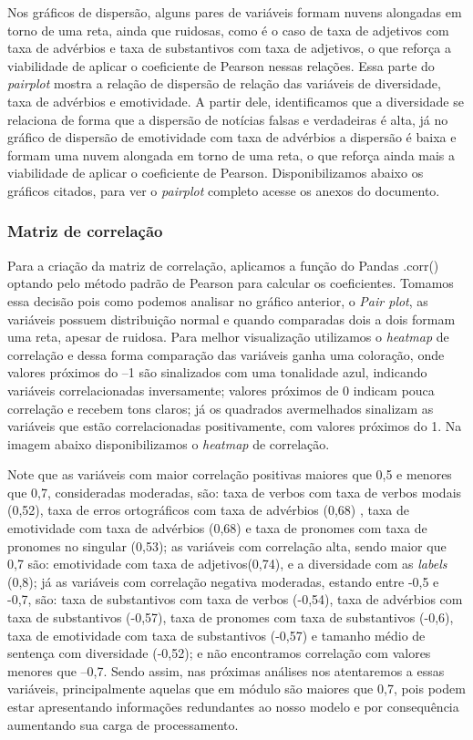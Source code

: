 \documentclass[
  brazilian,
  11pt,
]{article}
\begin{document}
Nos gráficos de dispersão, alguns pares de variáveis formam nuvens alongadas em torno de uma reta, ainda que ruidosas, como é o caso de taxa de adjetivos com taxa de advérbios e taxa de substantivos com taxa de adjetivos, o que reforça a viabilidade de aplicar o coeficiente de Pearson nessas relações. Essa parte do \emph{pairplot} mostra a relação de dispersão de relação das variáveis de diversidade, taxa de advérbios e emotividade. A partir dele, identificamos que a diversidade se relaciona de forma que a dispersão de notícias falsas e verdadeiras é alta, já no gráfico de dispersão de emotividade com taxa de advérbios a dispersão é baixa e formam uma nuvem alongada em torno de uma reta, o que reforça ainda mais a viabilidade de aplicar o coeficiente de Pearson. Disponibilizamos abaixo os gráficos citados, para ver o \emph{pairplot} completo acesse os anexos do documento.

\subsubsection{Matriz de correlação}\label{matriz-de-correlauxe7uxe3o}

Para a criação da matriz de correlação, aplicamos a função do Pandas .corr() optando pelo método padrão de Pearson para calcular os coeficientes. Tomamos essa decisão pois como podemos analisar no gráfico anterior, o \emph{Pair plot}, as variáveis possuem distribuição normal e quando comparadas dois a dois formam uma reta, apesar de ruidosa. Para melhor visualização utilizamos o \emph{heatmap} de correlação e dessa forma comparação das variáveis ganha uma coloração, onde valores próximos do --1 são sinalizados com uma tonalidade azul, indicando variáveis correlacionadas inversamente; valores próximos de 0 indicam pouca correlação e recebem tons claros; já os quadrados avermelhados sinalizam as variáveis que estão correlacionadas positivamente, com valores próximos do 1. Na imagem abaixo disponibilizamos o \emph{heatmap} de correlação.

Note que as variáveis com maior correlação positivas maiores que 0,5 e menores que 0,7, consideradas moderadas, são: taxa de verbos com taxa de verbos modais (0,52), taxa de erros ortográficos com taxa de advérbios (0,68) , taxa de emotividade com taxa de advérbios (0,68) e taxa de pronomes com taxa de pronomes no singular (0,53); as variáveis com correlação alta, sendo maior que 0,7 são: emotividade com taxa de adjetivos(0,74), e a diversidade com as \emph{labels} (0,8); já as variáveis com correlação negativa moderadas, estando entre -0,5 e -0,7, são: taxa de substantivos com taxa de verbos (-0,54), taxa de advérbios com taxa de substantivos (-0,57), taxa de pronomes com taxa de substantivos (-0,6), taxa de emotividade com taxa de substantivos (-0,57) e tamanho médio de sentença com diversidade (-0,52); e não encontramos correlação com valores menores que --0,7. Sendo assim, nas próximas análises nos atentaremos a essas variáveis, principalmente aquelas que em módulo são maiores que 0,7, pois podem estar apresentando informações redundantes ao nosso modelo e por consequência aumentando sua carga de processamento.
\end{document}
